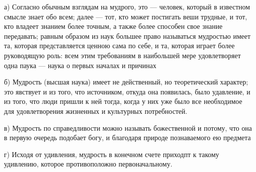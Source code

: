 \documentclass{article}
\begin{document}
а) Согласно обычным взглядам на мудрого, это — человек, который в известном смысле знает обо всем; далее — тот, кто может постигать веши трудные, и тот, кто владеет знанием более точным, а также более способен свое знание передавать; равным образом из наук большее право называться мудростью имеет та, которая представляется ценною сама по себе, и та, которая играет более руководящую роль: всем этим требованиям в наибольшей мере удовлетворяет одна паука — наука о первых началах и причинах

б) Мудрость (высшая наука) имеет не действенный, но теоретический характер; это явствует и из того, что источником, откуда она появилась, было удавление, и из того, что люди пришли к ней тогда, когда у них уже было все необходимое для удовлетворения жизненных и культурных потребностей.

в) Мудрость по справедливости можно называть божественной и потому, что она в первую очередь подобает богу, и благодаря природе познаваемого ею предмета

г) Исходя от удивления, мудрость в конечном счете приходпт к такому удивлению, которое противоположно первоначальному.
\end{document}
